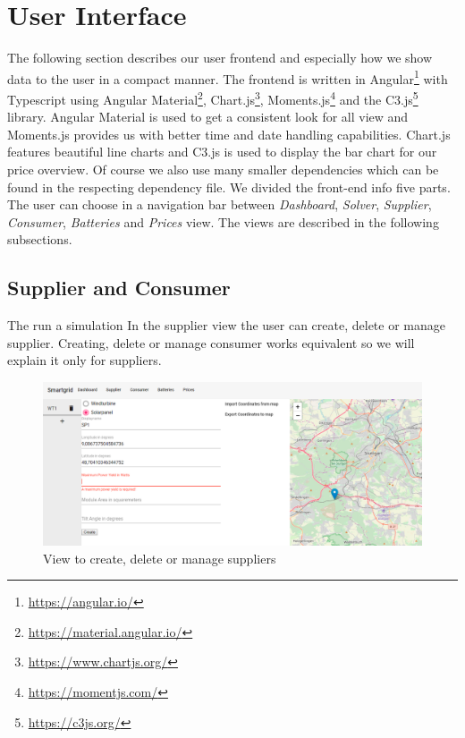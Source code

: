 \section{User Interface}\label{sec:frontend}
The following section describes our user frontend and especially how we show data to the user in a compact manner.
The frontend is written in Angular\footnote{\url{https://angular.io/}} with Typescript using Angular Material\footnote{\url{https://material.angular.io/}}, Chart.js\footnote{\url{https://www.chartjs.org/}}, Moments.js\footnote{\url{https://momentjs.com/}} and the C3.js\footnote{\url{https://c3js.org/}} library. 
Angular Material is used to get a consistent look for all view and Moments.js provides us with better time and date handling capabilities. Chart.js features beautiful line charts and C3.js is used to display the bar chart for our price overview. Of course we also use many smaller dependencies which can be found in the respecting dependency file.
We divided the front-end info five parts.
The user can choose in a navigation bar between \textit{Dashboard},
\textit{Solver}, \textit{Supplier}, \textit{Consumer}, \textit{Batteries} and \textit{Prices} view.
The views are described in the following subsections.

\subsection{Supplier and Consumer}
The run a simulation In the supplier view the user can create, delete or manage supplier.
Creating, delete or manage consumer works equivalent so we will explain it only for suppliers.

\begin{figure}[!h]
    \centering
    \includegraphics[width=1.00\textwidth]{../figures/supplierView.PNG}
    \caption{View to create, delete or manage suppliers}
    \label{fig:suppliers}
\end{figure}

